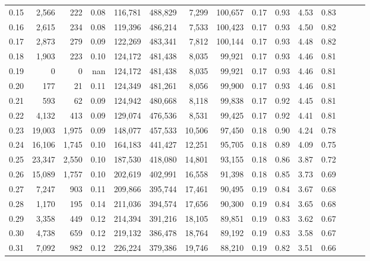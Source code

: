 \begin{tabular}{rrrrrrrrrrrrrrr}
0.15 &   2,566 &    222 &  0.08 &  116,781 &  488,829 &    7,299 &  100,657 &  0.17 &  0.93 &  4.53 &      0.83 \\
0.16 &   2,615 &    234 &  0.08 &  119,396 &  486,214 &    7,533 &  100,423 &  0.17 &  0.93 &  4.50 &      0.82 \\
0.17 &   2,873 &    279 &  0.09 &  122,269 &  483,341 &    7,812 &  100,144 &  0.17 &  0.93 &  4.48 &      0.82 \\
0.18 &   1,903 &    223 &  0.10 &  124,172 &  481,438 &    8,035 &   99,921 &  0.17 &  0.93 &  4.46 &      0.81 \\
0.19 &       0 &      0 &   nan &  124,172 &  481,438 &    8,035 &   99,921 &  0.17 &  0.93 &  4.46 &      0.81 \\
0.20 &     177 &     21 &  0.11 &  124,349 &  481,261 &    8,056 &   99,900 &  0.17 &  0.93 &  4.46 &      0.81 \\
0.21 &     593 &     62 &  0.09 &  124,942 &  480,668 &    8,118 &   99,838 &  0.17 &  0.92 &  4.45 &      0.81 \\
0.22 &   4,132 &    413 &  0.09 &  129,074 &  476,536 &    8,531 &   99,425 &  0.17 &  0.92 &  4.41 &      0.81 \\
0.23 &  19,003 &  1,975 &  0.09 &  148,077 &  457,533 &   10,506 &   97,450 &  0.18 &  0.90 &  4.24 &      0.78 \\
0.24 &  16,106 &  1,745 &  0.10 &  164,183 &  441,427 &   12,251 &   95,705 &  0.18 &  0.89 &  4.09 &      0.75 \\
0.25 &  23,347 &  2,550 &  0.10 &  187,530 &  418,080 &   14,801 &   93,155 &  0.18 &  0.86 &  3.87 &      0.72 \\
0.26 &  15,089 &  1,757 &  0.10 &  202,619 &  402,991 &   16,558 &   91,398 &  0.18 &  0.85 &  3.73 &      0.69 \\
0.27 &   7,247 &    903 &  0.11 &  209,866 &  395,744 &   17,461 &   90,495 &  0.19 &  0.84 &  3.67 &      0.68 \\
0.28 &   1,170 &    195 &  0.14 &  211,036 &  394,574 &   17,656 &   90,300 &  0.19 &  0.84 &  3.65 &      0.68 \\
0.29 &   3,358 &    449 &  0.12 &  214,394 &  391,216 &   18,105 &   89,851 &  0.19 &  0.83 &  3.62 &      0.67 \\
0.30 &   4,738 &    659 &  0.12 &  219,132 &  386,478 &   18,764 &   89,192 &  0.19 &  0.83 &  3.58 &      0.67 \\
0.31 &   7,092 &    982 &  0.12 &  226,224 &  379,386 &   19,746 &   88,210 &  0.19 &  0.82 &  3.51 &      0.66 \\

\end{tabular}
